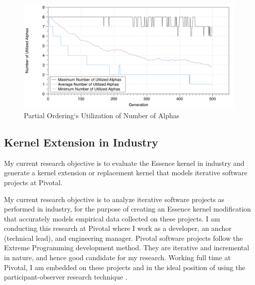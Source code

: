 \documentclass[preprint,12pt,3p]{elsarticle}
\begin{document}
\begin{figure}[ht]\vspace*{4pt}
\centerline{\includegraphics[width=5.00in]{genetic_programming/number_of_alphas_partial_ordering_500gens_40runs_8alpha}}
\caption{Partial Ordering`s Utilization of Number of Alphas}\vspace*{-6pt}
\label{NumberOfAlphasPartialOrdering}
\end{figure}


\subsection{Kernel Extension in Industry}
\label{PivotalKernelExtension}
My current research objective is to evaluate the Essence kernel in industry and generate a kernel extension or replacement kernel that models iterative software projects at Pivotal.

My current research objective is to analyze iterative software projects as performed in industry, for the purpose of creating an Essence kernel modification that accurately models empirical data collected on these projects. I am conducting this research at Pivotal where I work as a developer, an anchor (technical lead), and engineering manager. Pivotal software projects follow the Extreme Programming \cite{ExtremeProgrammingExplained} development method. They are iterative and incremental in nature, and hence good candidate for my research. Working full time at Pivotal, I am embedded on these projects and in the ideal position of using the participant-observer research technique \cite{QualitativeMethods}. 
\end{document}
